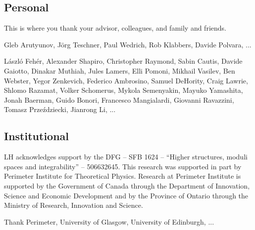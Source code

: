 
\subsection*{Personal}

This is where you thank your advisor, colleagues, and family and friends.

Gleb Arutyunov, Jörg Teschner, Paul Wedrich, Rob Klabbers, Davide Polvara, ...

László Fehér, Alexander Shapiro, Christopher Raymond, Sabin Cautis, Davide Gaiotto, Dinakar Muthiah, Jules Lamers, Elli Pomoni, Mikhail Vasilev, Ben Webster, Yegor Zenkevich, Federico Ambrosino, Samuel DeHority, Craig Lawrie, Shlomo Razamat, Volker Schomerus, Mykola Semenyakin, Mayuko Yamashita, Jonah Baerman, Guido Bonori, Francesco Mangialardi, Giovanni Ravazzini, Tomasz Przeździecki, Jianrong Li, ...

\subsection*{Institutional}

LH acknowledges support by the DFG -- SFB 1624 -- ``Higher structures, moduli spaces and integrability'' -- 506632645. This research was supported in part by Perimeter Institute for Theoretical Physics. Research at Perimeter Institute is supported by the Government of Canada through the Department of Innovation, Science and Economic Development and by the Province of Ontario through the Ministry of Research, Innovation and Science.

Thank Perimeter, University of Glasgow, University of Edinburgh, ...